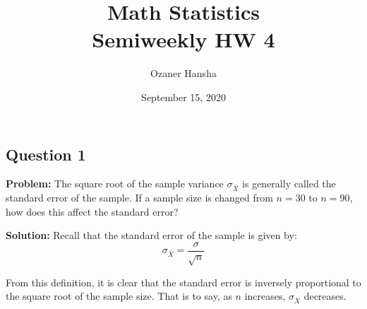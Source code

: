 \documentclass{article}
\begin{document}
\title{Math Statistics\\ Semiweekly HW 4}
\author{Ozaner Hansha}
\date{September 15, 2020}
\maketitle

\subsection*{Question 1}
\noindent\textbf{Problem:} The square root of the sample variance $\sigma_{\bar{X}}$ is generally called the standard error of the sample. If a sample size is changed from $n=30$ to $n=90$, how does this affect the standard error?
\bigskip

\noindent\textbf{Solution:} Recall that the standard error of the sample is given by:
$$\sigma_{\bar{X}}=\frac{\sigma}{\sqrt{n}}$$

From this definition, it is clear that the standard error is inversely proportional to the square root of the sample size. That is to say, as $n$ increases, $\sigma_{\bar{X}}$ decreases.
\end{document}

